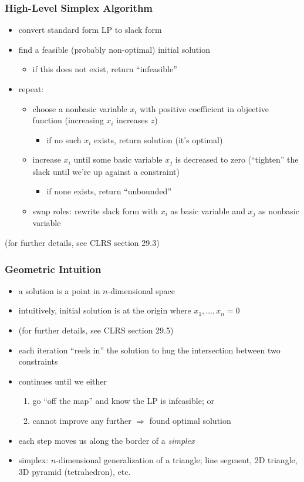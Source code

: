 \documentclass{beamer}
\begin{document}
\begin{frame} \frametitle{High-Level Simplex Algorithm}
  \begin{itemize}
    \item convert standard form LP to slack form
    \item find a feasible (probably non-optimal) initial solution
    \begin{itemize}
      \item if this does not exist, return ``infeasible''
    \end{itemize}
    \item repeat:
    \begin{itemize}
      \item choose a nonbasic variable $x_i$ with positive coefficient in objective
        function (increasing $x_i$ increases $z$)
        \begin{itemize}
          \item if no such $x_i$ exists, return solution (it's optimal)
        \end{itemize}
      \item increase $x_i$ until some basic variable $x_j$ is decreased to zero
        (``tighten'' the slack until we're up against a constraint)
        \begin{itemize}
          \item if none exists, return ``unbounded''
        \end{itemize}
      \item swap roles: rewrite slack form with $x_i$ as basic variable and
        $x_j$ as nonbasic variable
    \end{itemize}
  \end{itemize}
  (for further details, see CLRS section 29.3)
\end{frame}

\begin{frame} \frametitle{Geometric Intuition}
\begin{itemize}
  \item a solution is a point in $n$-dimensional space
  \item intuitively, initial solution is at the origin where $x_1, \ldots, x_n = 0$
  \item (for further details, see CLRS section 29.5)
  \item each iteration ``reels in'' the solution to hug the intersection between
    two constraints
  \item continues until we either
  \begin{enumerate}
    \item go ``off the map'' and know the LP is infeasible; or
    \item cannot improve any further $\Rightarrow$ found optimal solution
  \end{enumerate}
  \item each step moves us along the border of a \emph{simplex}
  \item simplex: $n$-dimensional generalization of a triangle; line segment,
    2D triangle, 3D pyramid (tetrahedron), etc.
\end{itemize}
\end{frame}
\end{document}
